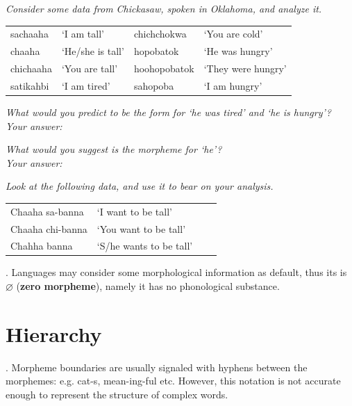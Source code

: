\documentclass[11pt, oneside]{article}   	%
\begin{document}
{\itshape Consider some data from Chickasaw, spoken in Oklahoma, and analyze it.}

\begin{center}
\begin{tabular}{l l l l}
sachaaha     &	`I am tall'	&	chichchokwa   &    `You are cold' \\
chaaha        & `He/she is tall'     &    	hopobatok         &      `He was hungry' \\
chichaaha     &       `You are tall'     &         	hoohopobatok  &   `They were hungry' \\
satikahbi      &        `I am tired'      &              sahopoba &         `I am hungry'\\
\end{tabular}
\end{center}

{\itshape What would you predict to be the form for `he was tired' and `he is hungry'?\\
Your answer:} \vspace{1cm}

{\itshape What would you suggest is the morpheme for `he'?\\
Your answer:} \vspace{1cm}

{\itshape Look at the following data, and use it to bear on your analysis.}

\begin{center}
\begin{tabular}{l l l l}
Chaaha sa-banna 	&	`I want to be tall' \\
Chaaha chi-banna	& 	`You want to be tall'\\
Chahha banna		&	`S/he wants to be tall'\\
\end{tabular}
\end{center}

\ex. Languages may consider some morphological information as default, thus its is $\varnothing$ ({\bfseries zero morpheme}), namely it has no phonological substance.

\section{Hierarchy} 

\ex. Morpheme boundaries are usually signaled with hyphens between the morphemes: e.g. cat-s, mean-ing-ful etc. However, this notation is not accurate enough to represent the structure of complex words. 
\end{document}
